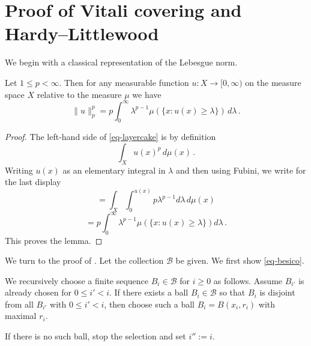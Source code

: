 \chapter{Proof of Vitali covering and Hardy--Littlewood}
\label{sec-hlm}


We begin with a classical representation of the Lebesgue norm.
\begin{lemma}\label{layer-cake-representation}
\leanok
{}
Let $1\le p< \infty$. Then for any measurable function $u:X\to [0,\infty)$ on the measure space $X$
relative to the measure $\mu$
we have
\begin{equation}\label{eq-layercake}
    \|u\|_p^p=p\int_0^\infty \lambda^{p-1}\mu(\{x: u(x)\ge \lambda\})\, d\lambda\, .
\end{equation}
\end{lemma}
\begin{proof}
    The left-hand side of \eqref{eq-layercake} is by definition
\begin{equation}
    \int_X u(x)^p \, d\mu(x)\, .\end{equation}
    Writing $u(x)$ as an elementary integral in $\lambda$ and then using Fubini, we write for the last display
    \begin{equation}
    =\int_X \int _0^{u(x)}
    p \lambda^{p-1} d\lambda\, d\mu(x)
\end{equation}
\begin{equation}
 =p\int _0^{\infty}
    \lambda^{p-1} \mu(\{x: u(x)\ge \lambda\}) d\lambda\, .
\end{equation}
This proves the lemma.
\end{proof}

We turn to the proof of .
Let the collection $\mathcal{B}$ be given.
We first show \eqref{eq-besico}.



We recursively choose a finite sequence $B_i\in \mathcal{B}$
for $i\ge 0$ as follows. Assume $B_{i'}$
is already chosen for $0\le i'<i$.
If there exists a ball $B_{i}\in \mathcal{B}$ so that $B_{i}$
is disjoint from all $B_{i'}$
with $0\le i'<i$, then choose
such a ball $B_i=B(x_i,r_i)$ with maximal $r_i$.

If there is no such ball, stop the selection and set
$i'':=i$.

